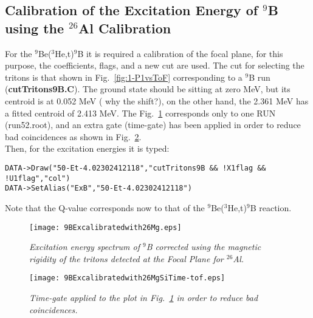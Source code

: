 \documentclass[11pt]{report}
\begin{document}
\subsection{Calibration of the Excitation Energy of $^{9}$B using the $^{26}$Al Calibration}

For the $^{9}$Be($^{3}$He,t)$^{9}$B it is required a calibration of the focal plane, for this purpose, the coefficients, flags, and a new cut are used. The cut for selecting
the tritons is that shown in Fig.~\ref{fig:1-P1vsToF} corresponding to a $^{9}$B run (\textbf{cutTritons9B.C}). The ground state should be sitting at zero MeV, but its centroid is at 0.052 MeV 
({\color{red} why the shift?}), on the other hand, the 2.361 MeV has a fitted centroid of 2.413 MeV. The Fig.~\ref{fig:9BExcalibratedwith26Mg} corresponds only to one RUN (run52.root), and an 
extra gate (time-gate) has been applied in order to reduce bad coincidences as shown in Fig.~\ref{fig:9BExcalibratedwith26MgSiTime-tof}.\\

\noindent
Then, for the excitation energies it is typed:
\begin{verbatim}
DATA->Draw("50-Et-4.02302412118","cutTritons9B && !X1flag && !U1flag","col")
DATA->SetAlias("ExB","50-Et-4.02302412118")
\end{verbatim}

\noindent
Note that the Q-value corresponds now to that of the $^{9}$Be($^{3}$He,t)$^{9}$B reaction.\\

\begin{figure}[h]
 \begin{center}
\texttt{[image: 9BExcalibratedwith26Mg.eps]}  
 \end{center}
\vspace*{-4mm}
\caption{\label{fig:9BExcalibratedwith26Mg} \it Excitation energy spectrum of $^{9}$B corrected using the magnetic rigidity of the tritons detected at the Focal Plane for $^{26}$Al.}
\end{figure}
\vspace*{4mm}

\begin{figure}[h]
 \begin{center}
\texttt{[image: 9BExcalibratedwith26MgSiTime-tof.eps]}  
 \end{center}
\vspace*{-4mm}
\caption{\label{fig:9BExcalibratedwith26MgSiTime-tof} \it Time-gate applied to the plot in Fig.~\ref{fig:9BExcalibratedwith26Mg} in order to reduce bad coincidences.}
\end{figure}
\vspace*{4mm}
\end{document}
